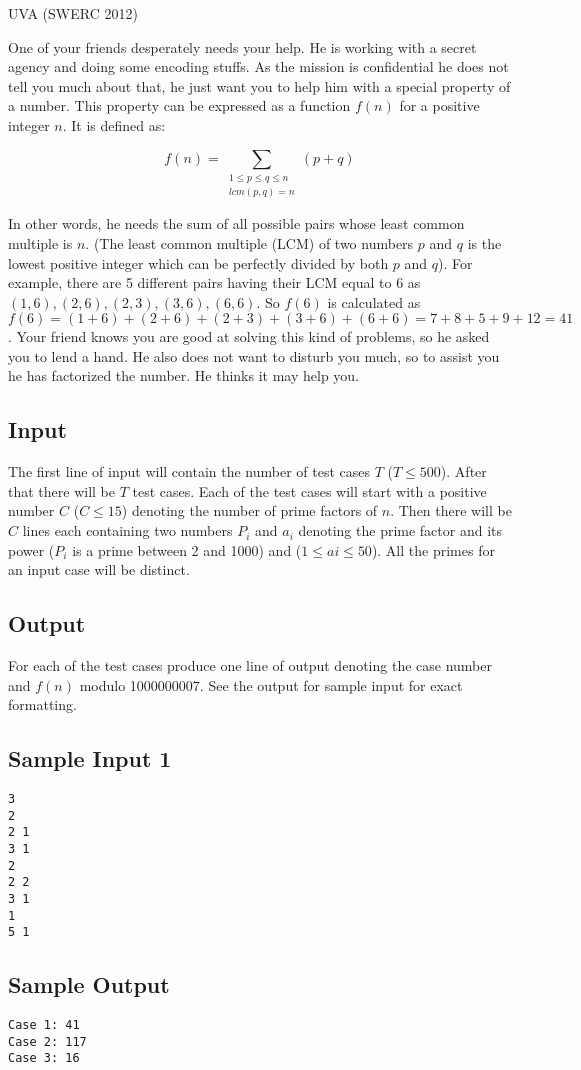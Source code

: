

\noindent
UVA  (SWERC 2012)\bigskip

One of your friends desperately needs your help. He is working with a secret agency and doing some encoding stuffs. As the mission is confidential he does not tell you much about that, he just want you to help him with a special property of a number. This property can be expressed as a function $f(n)$ for a positive integer $n$. It is defined as:

\[ f(n) = \sum_{\substack{1 \leqslant p \leqslant q \leqslant n\\lcm(p, q) = n}} (p + q) \]

In other words, he needs the sum of all possible pairs whose least common multiple is $n$. (The least common multiple (LCM) of two numbers $p$ and $q$ is the lowest positive integer which can be perfectly divided by both $p$ and $q$). For example, there are 5 different pairs having their LCM equal to 6 as $(1, 6), (2, 6), (2, 3), (3, 6), (6, 6)$. So $f(6)$ is calculated as $f(6) = (1+6)+(2+6)+(2+3)+(3+6)+(6+6) = 7 + 8 + 5 + 9 + 12 = 41$.
Your friend knows you are good at solving this kind of problems, so he asked you to lend a hand. He also does not want to disturb you much, so to assist you he has factorized the number. He thinks it may help you.

\subsection*{Input}

The first line of input will contain the number of test cases $T$ ($T \leqslant 500$). After that there will be $T$ test cases. Each of the test cases will start with a positive number $C$ ($C \leqslant 15$) denoting the number of prime factors of $n$. Then there will be $C$ lines each containing two numbers $P_i$ and $a_i$ denoting the prime factor and its power ($P_i$ is a prime between 2 and 1000) and ($1 \leqslant ai \leqslant 50$). All the primes for an input case will be distinct.

\subsection*{Output}

For each of the test cases produce one line of output denoting the case number and $f(n)$ modulo 1000000007. See the output for sample input for exact formatting.

\subsection*{Sample Input 1}

\begin{verbatim}
3
2
2 1
3 1
2
2 2
3 1
1
5 1
\end{verbatim}

\subsection*{Sample Output}

\begin{verbatim}
Case 1: 41
Case 2: 117
Case 3: 16
\end{verbatim}
